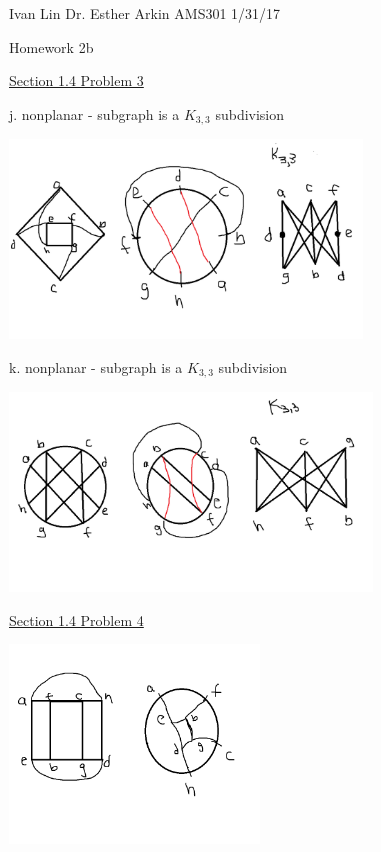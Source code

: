 \documentclass{article}
\begin{document}
Ivan Lin\newline{}
Dr. Esther Arkin\newline{}
AMS301\newline{}
1/31/17

\begin{center}
  Homework 2b
\end{center}

\underline{Section 1.4 Problem 3}

j. nonplanar - subgraph is a $K_{3,3}$ subdivision\newline{}

\includegraphics[height=200px]{hw2q3j.png}\newline{}

k. nonplanar - subgraph is a $K_{3,3}$ subdivision\newline{}

\includegraphics[height=200px]{hw2q3k.png}\newline{}

\underline{Section 1.4 Problem 4}\newline{}

\includegraphics[height=200px]{hw2q4.png}\newline{}
\end{document}
